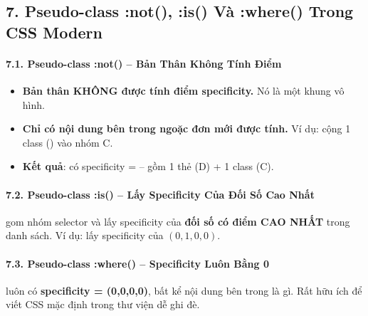 \subsection{7. Pseudo-class :not(), :is() Và :where() Trong CSS Modern}

\paragraph{7.1. Pseudo-class :not() -- Bản Thân Không Tính Điểm}

\begin{conceptBox}
\begin{itemize}[leftmargin=1.5em, itemsep=3pt, parsep=0pt]
    \item \textbf{Bản thân  KHÔNG được tính điểm specificity.} Nó là một khung vô hình.
    \item \textbf{Chỉ có nội dung bên trong ngoặc đơn mới được tính.} Ví dụ:  cộng 1 class () vào nhóm C.
    \item \textbf{Kết quả}:  có specificity =  -- gồm 1 thẻ  (D) + 1 class  (C).
\end{itemize}
\end{conceptBox}

\paragraph{7.2. Pseudo-class :is() -- Lấy Specificity Của Đối Số Cao Nhất}

\begin{conceptBox}
 gom nhóm selector và lấy specificity của \textbf{ đối số có điểm CAO NHẤT} trong danh sách. Ví dụ:  lấy specificity của  $(0,1,0,0)$.
\end{conceptBox}

\paragraph{7.3. Pseudo-class :where() -- Specificity Luôn Bằng 0}

\begin{conceptBox}
 luôn có \textbf{specificity = (0,0,0,0)}, bất kể nội dung bên trong là gì. Rất hữu ích để viết CSS mặc định trong thư viện dễ ghi đè.
\end{conceptBox}

